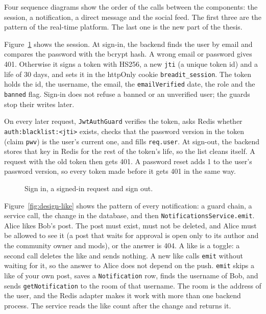 Four sequence diagrams show the order of the calls between the components: the session, a notification, a direct message and the social feed. The first three are the pattern of the real-time platform. The last one is the new part of the thesis.

Figure~\ref{fig:design-session} shows the session. At sign-in, the backend finds the user by email and compares the password with the bcrypt hash. A wrong email or password gives 401. Otherwise it signs a token with HS256, a new \texttt{jti} (a unique token id) and a life of 30 days, and sets it in the httpOnly cookie \texttt{breadit\_session}. The token holds the id, the username, the email, the \texttt{emailVerified} date, the role and the \texttt{banned} flag. Sign-in does not refuse a banned or an unverified user; the guards stop their writes later.

On every later request, \texttt{JwtAuthGuard} verifies the token, asks Redis whether \texttt{auth:blacklist:<jti>} exists, checks that the password version in the token (claim \texttt{pwv}) is the user's current one, and fills \texttt{req.user}. At sign-out, the backend stores that key in Redis for the rest of the token's life, so the list cleans itself. A request with the old token then gets 401. A password reset adds 1 to the user's password version, so every token made before it gets 401 in the same way.

\begin{figure}[htbp]
  \centering
  \caption{Sign in, a signed-in request and sign out.}
  \label{fig:design-session}
\end{figure}

Figure~\ref{fig:design-like} shows the pattern of every notification: a guard chain, a service call, the change in the database, and then \texttt{NotificationsService.emit}. Alice likes Bob's post. The post must exist, must not be deleted, and Alice must be allowed to see it (a post that waits for approval is open only to its author and the community owner and mods), or the answer is 404. A like is a toggle: a second call deletes the like and sends nothing. A new like calls \texttt{emit} without waiting for it, so the answer to Alice does not depend on the push. \texttt{emit} skips a like of your own post, saves a \texttt{Notification} row, finds the username of Bob, and sends \texttt{getNotification} to the room of that username. The room is the address of the user, and the Redis adapter makes it work with more than one backend process. The service reads the like count after the change and returns it.

